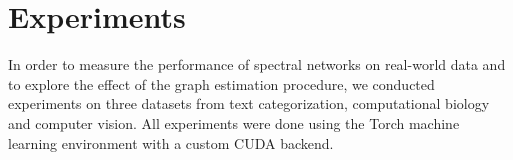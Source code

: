 %
%
%
%
%
%
%
%
%
%
%
%
%
%

\section{Experiments}
\label{experimentssect}
In order to measure the performance of spectral networks on real-world data and to explore the effect of the graph estimation procedure, we conducted experiments on three datasets from text categorization, computational biology and computer vision. All experiments were done using the Torch machine learning environment with a custom CUDA backend.

